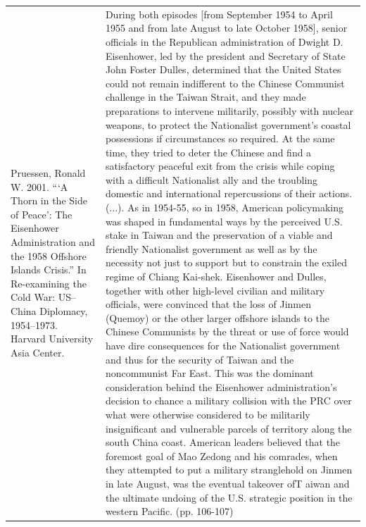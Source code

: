 {\begin{longtable}{p{}p{}}
\\
Pruessen, Ronald W. 2001. “‘A Thorn in the Side of Peace’: The Eisenhower Administration and the 1958 Offshore Islands Crisis.” In Re-examining the Cold War: US–China Diplomacy, 1954–1973. Harvard University Asia Center. & During both episodes [from September 1954 to April 1955 and from late August to late October 1958], senior officials in the Republican administration of Dwight D. Eisenhower, led by the president and Secretary of State John Foster Dulles, determined that the United States could not remain indifferent to the Chinese Communist challenge in the Taiwan Strait, and they made preparations to intervene militarily, possibly with nuclear weapons, to protect the Nationalist government's coastal possessions if circumstances so required. At the same time, they tried to deter the Chinese and find a satisfactory peaceful exit from the crisis while coping with a difficult Nationalist ally and the troubling domestic and international repercussions of their actions. (...). As in 1954-55, so in 1958, American policymaking was shaped in fundamental ways by the perceived U.S. stake in Taiwan and the preservation of a viable and friendly Nationalist government as well as by the necessity not just to support but to constrain the exiled regime of Chiang Kai-shek. Eisenhower and Dulles, together with other high-level civilian and military officials, were convinced that the loss of Jinmen (Quemoy) or the other larger offshore islands to the Chinese Communists by the threat or use of force would have dire consequences for the Nationalist government and thus for the security of Taiwan and the noncommunist Far East. This was the dominant consideration behind the Eisenhower administration's decision to chance a military collision with the PRC over what were otherwise considered to be militarily insignificant and vulnerable parcels of territory along the south China coast. American leaders believed that the foremost goal of Mao Zedong and his comrades, when they attempted to put a military stranglehold on Jinmen in late August, was the eventual takeover ofT aiwan and the ultimate undoing of the U.S. strategic position in the western Pacific. (pp. 106-107)
\\

\end{longtable}}
